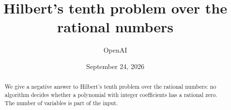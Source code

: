 \documentclass[11pt]{article}
\title{Hilbert's tenth problem over the rational numbers}
\author{OpenAI}
\date{September 24, 2026}
\numberwithin{equation}{section}
\theoremstyle{definition}
\begin{document}
\maketitle
\begin{abstract}
We give a negative answer to Hilbert's tenth problem over the rational numbers:
no algorithm decides whether a polynomial with integer coefficients has a rational
zero. The number of variables is part of the input.
\end{abstract}
\clearpage
{\small\setlength{\parskip}{0pt}\tableofcontents}
\clearpage










\end{document}
